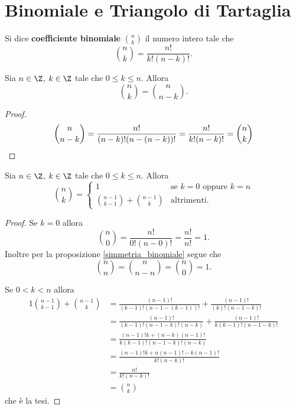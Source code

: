 \section{Binomiale e Triangolo di Tartaglia}

\begin{definition}
    Si dice \textbf{coefficiente binomiale} $\binom{n}{k}$ il numero intero tale che \begin{equation}
        \binom{n}{k} = \frac{n!}{k!(n-k)!}.
    \end{equation}    
\end{definition}

\begin{proposition}\label{simmetria_binomiale}
    Sia $n \in \Z$, $k \in \Z$ tale che $0 \leq k \leq n$. Allora \begin{equation}
        \binom{n}{k} = \binom{n}{n-k}.
    \end{equation}
\end{proposition}
\begin{proof}
    \[\binom{n}{n - k} = \frac{n!}{(n-k)!(n-(n-k))!} = \frac{n!}{k!(n-k)!} = \binom{n}{k} \qedhere\]
\end{proof}

\begin{proposition} \label{binomiale_ricorsivo}
    Sia $n \in \Z$, $k \in \Z$ tale che $0 \leq k \leq n$. Allora \begin{equation}
        \binom{n}{k} = \begin{cases}
            1 &\text{se } k = 0 \text{ oppure } k = n \\
            \binom{n - 1}{k - 1} + \binom{n - 1}{k} &\text{altrimenti}.
        \end{cases}
    \end{equation}
\end{proposition}
\begin{proof}
    Se $k = 0$ allora \[\binom{n}{0} = \frac{n!}{0!(n-0)!} = \frac{n!}{n!} = 1.\] 
    Inoltre per la proposizione \ref{simmetria_binomiale} segue che \[\binom{n}{n} = \binom{n}{n - n} = \binom{n}{0} = 1.\]

    Se $0 < k < n$ allora \begin{alignat*}
        {1}
        \binom{n - 1}{k - 1} + \binom{n - 1}{k} &= \frac{(n-1)!}{(k-1)!(n-1-(k-1))!} + \frac{(n-1)!}{(k)!(n-1-k)!} \\[1em]
        &= \frac{(n-1)!}{(k-1)!(n-1-k)!(n-k)} + \frac{(n-1)!}{k(k-1)!(n-1-k)!} \\[1em]
        &= \frac{(n-1)!k + (n-k)(n-1)!}{k(k-1)!(n-1-k)!(n-k)} \\[1em]
        &= \frac{(n-1)!k + n(n-1)! - k(n-1)!}{k!(n-k)!} \\
        &= \frac{n!}{k!(n-k)!} \\[1em]
        &= \binom{n}{k}
    \end{alignat*}
    che è la tesi.
\end{proof}

